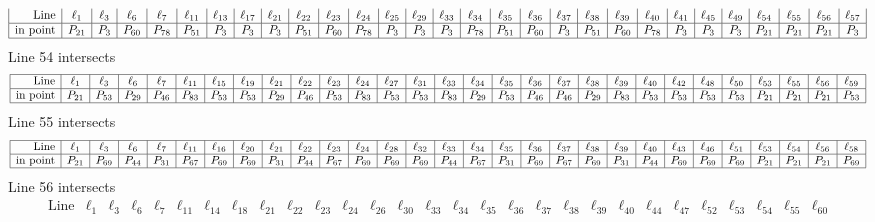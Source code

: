 \documentclass{article}
\begin{document}
{$$\begin{array}{|r*{28}{|c}|}
\mbox{Line}  & \ell_{1} & \ell_{3} & \ell_{6} & \ell_{7} & \ell_{11} & \ell_{13} & \ell_{17} & \ell_{21} & \ell_{22} & \ell_{23} & \ell_{24} & \ell_{25} & \ell_{29} & \ell_{33} & \ell_{34} & \ell_{35} & \ell_{36} & \ell_{37} & \ell_{38} & \ell_{39} & \ell_{40} & \ell_{41} & \ell_{45} & \ell_{49} & \ell_{54} & \ell_{55} & \ell_{56} & \ell_{57}\\
\hline
\mbox{in point}  & P_{21} & P_{3} & P_{60} & P_{78} & P_{51} & P_{3} & P_{3} & P_{3} & P_{51} & P_{60} & P_{78} & P_{3} & P_{3} & P_{3} & P_{78} & P_{51} & P_{60} & P_{3} & P_{51} & P_{60} & P_{78} & P_{3} & P_{3} & P_{3} & P_{21} & P_{21} & P_{21} & P_{3}\\
\hline
\end{array}
$$
Line 54 intersects 
$$
\begin{array}{|r*{28}{|c}|}
\hline
\mbox{Line}  & \ell_{1} & \ell_{3} & \ell_{6} & \ell_{7} & \ell_{11} & \ell_{15} & \ell_{19} & \ell_{21} & \ell_{22} & \ell_{23} & \ell_{24} & \ell_{27} & \ell_{31} & \ell_{33} & \ell_{34} & \ell_{35} & \ell_{36} & \ell_{37} & \ell_{38} & \ell_{39} & \ell_{40} & \ell_{42} & \ell_{48} & \ell_{50} & \ell_{53} & \ell_{55} & \ell_{56} & \ell_{59}\\
\hline
\mbox{in point}  & P_{21} & P_{53} & P_{29} & P_{46} & P_{83} & P_{53} & P_{53} & P_{29} & P_{46} & P_{53} & P_{83} & P_{53} & P_{53} & P_{83} & P_{29} & P_{53} & P_{46} & P_{46} & P_{29} & P_{83} & P_{53} & P_{53} & P_{53} & P_{53} & P_{21} & P_{21} & P_{21} & P_{53}\\
\hline
\end{array}
$$
Line 55 intersects 
$$
\begin{array}{|r*{28}{|c}|}
\hline
\mbox{Line}  & \ell_{1} & \ell_{3} & \ell_{6} & \ell_{7} & \ell_{11} & \ell_{16} & \ell_{20} & \ell_{21} & \ell_{22} & \ell_{23} & \ell_{24} & \ell_{28} & \ell_{32} & \ell_{33} & \ell_{34} & \ell_{35} & \ell_{36} & \ell_{37} & \ell_{38} & \ell_{39} & \ell_{40} & \ell_{43} & \ell_{46} & \ell_{51} & \ell_{53} & \ell_{54} & \ell_{56} & \ell_{58}\\
\hline
\mbox{in point}  & P_{21} & P_{69} & P_{44} & P_{31} & P_{67} & P_{69} & P_{69} & P_{31} & P_{44} & P_{67} & P_{69} & P_{69} & P_{69} & P_{44} & P_{67} & P_{31} & P_{69} & P_{67} & P_{69} & P_{31} & P_{44} & P_{69} & P_{69} & P_{69} & P_{21} & P_{21} & P_{21} & P_{69}\\
\hline
\end{array}
$$
Line 56 intersects 
$$
\begin{array}{|r*{28}{|c}|}
\hline
\mbox{Line}  & \ell_{1} & \ell_{3} & \ell_{6} & \ell_{7} & \ell_{11} & \ell_{14} & \ell_{18} & \ell_{21} & \ell_{22} & \ell_{23} & \ell_{24} & \ell_{26} & \ell_{30} & \ell_{33} & \ell_{34} & \ell_{35} & \ell_{36} & \ell_{37} & \ell_{38} & \ell_{39} & \ell_{40} & \ell_{44} & \ell_{47} & \ell_{52} & \ell_{53} & \ell_{54} & \ell_{55} & \ell_{60}\\

\end{array}$$}
\end{document}

